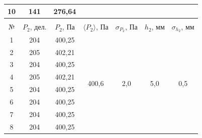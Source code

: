 \documentclass[a4paper, 12pt]{article}
\begin{document}
\begin{table}[H]
\begin{tabular}{ccccccc}
                \multicolumn{1}{|c|}{10} & \multicolumn{1}{c|}{141} & \multicolumn{1}{c|}{276,64} & \multicolumn{1}{c|}{} & \multicolumn{1}{c|}{} & \multicolumn{1}{c|}{} & \multicolumn{1}{c|}{} \\ \hline
    		&
    		&
    		&
    		&
    		&
    		&
    		\\ \hline
    		\multicolumn{1}{|c|}{№} &
    		\multicolumn{1}{c|}{$ P_2 $, дел.} &
    		\multicolumn{1}{c|}{$ P_2 $, Па} &
    		\multicolumn{1}{c|}{$ \langle P_2 \rangle $, Па} &
    		\multicolumn{1}{c|}{$ \sigma_{P_2} $, Па} &
    		\multicolumn{1}{c|}{$ h_2 $, мм} &
    		\multicolumn{1}{c|}{$ \sigma_{h_2} $, мм} \\ \hline
                \multicolumn{1}{|c|}{1} & \multicolumn{1}{c|}{204} & \multicolumn{1}{c|}{400,25} & \multicolumn{1}{c|}{\multirow{10}{*}{400,6}} & \multicolumn{1}{c|}{\multirow{10}{*}{2,0}} & \multicolumn{1}{c|}{\multirow{10}{*}{5,0}} & \multicolumn{1}{c|}{\multirow{10}{*}{0,5}} \\ \cline{1-3}
                \multicolumn{1}{|c|}{2} & \multicolumn{1}{c|}{205} & \multicolumn{1}{c|}{402,21} & \multicolumn{1}{c|}{} & \multicolumn{1}{c|}{} & \multicolumn{1}{c|}{} & \multicolumn{1}{c|}{} \\ \cline{1-3}
                \multicolumn{1}{|c|}{3} & \multicolumn{1}{c|}{204} & \multicolumn{1}{c|}{400,25} & \multicolumn{1}{c|}{} & \multicolumn{1}{c|}{} & \multicolumn{1}{c|}{} & \multicolumn{1}{c|}{} \\ \cline{1-3}
                \multicolumn{1}{|c|}{4} & \multicolumn{1}{c|}{205} & \multicolumn{1}{c|}{402,21} & \multicolumn{1}{c|}{} & \multicolumn{1}{c|}{} & \multicolumn{1}{c|}{} & \multicolumn{1}{c|}{} \\ \cline{1-3}
                \multicolumn{1}{|c|}{5} & \multicolumn{1}{c|}{204} & \multicolumn{1}{c|}{400,25} & \multicolumn{1}{c|}{} & \multicolumn{1}{c|}{} & \multicolumn{1}{c|}{} & \multicolumn{1}{c|}{} \\ \cline{1-3}
                \multicolumn{1}{|c|}{6} & \multicolumn{1}{c|}{204} & \multicolumn{1}{c|}{400,25} & \multicolumn{1}{c|}{} & \multicolumn{1}{c|}{} & \multicolumn{1}{c|}{} & \multicolumn{1}{c|}{} \\ \cline{1-3}
                \multicolumn{1}{|c|}{7} & \multicolumn{1}{c|}{204} & \multicolumn{1}{c|}{400,25} & \multicolumn{1}{c|}{} & \multicolumn{1}{c|}{} & \multicolumn{1}{c|}{} & \multicolumn{1}{c|}{} \\ \cline{1-3}
                \multicolumn{1}{|c|}{8} & \multicolumn{1}{c|}{204} & \multicolumn{1}{c|}{400,25} & \multicolumn{1}{c|}{} & \multicolumn{1}{c|}{} & \multicolumn{1}{c|}{} & \multicolumn{1}{c|}{} \\ \cline{1-3}

\end{tabular}
\end{table}
\end{document}
